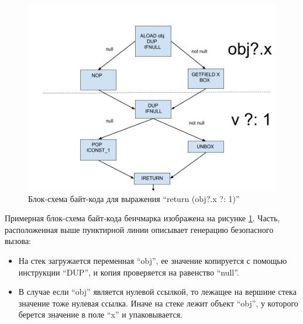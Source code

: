 
\begin{figure}
\begin{center}
    \includegraphics[scale=0.4]{../resources/safecall_elvis.png}
\end{center}
\caption{Блок-схема байт-кода для выражения ``return (obj?.x ?: 1)''}
\label{sc:elvis}
\end{figure}

Примерная блок-схема байт-кода бенчмарка изображена на рисунке \ref{sc:elvis}.
Часть, расположенная выше пунктирной линии описывает генерацию безопасного вызова:
\begin{itemize}
    \item На стек загружается переменная ``obj'', ее значение копируется с помощью инструкции
    ``DUP'', и копия проверяется на равенство ``null''.
    \item В случае если ``obj'' является нулевой ссылкой, то лежащее на вершине стека значение
    тоже нулевая ссылка.
    Иначе на стеке лежит объект ``obj'', у которого берется значение в поле ``x'' и упаковывается.
\end{itemize}

